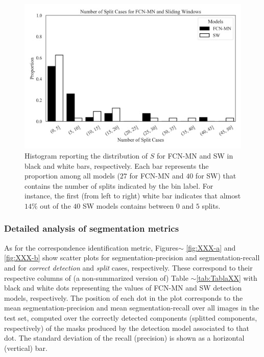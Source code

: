 \documentclass[a4paper,authoryear,review]{elsarticle}
\begin{document}
\begin{figure}
    \centering
    \includegraphics[width=\textwidth]{figures/PPP_split_distribution.png}
    \caption{
Histogram reporting the distribution of $S$ for FCN-MN and SW in black and white bars, respectively. Each bar represents the proportion among all models ($27$ for FCN-MN  and $40$ for SW) that contains the number of splits indicated by the bin label. For instance, the first (from left to right) white bar indicates that almost $14\%$ out of the $40$ SW models contains between $0$ and $5$ splits.
    }
    \label{fig:number-of-split}
\end{figure}


\subsubsection{Detailed analysis of segmentation metrics}

As for the correspondence identification metric, Figures$\sim$ \ref{fig:XXX-a} and \ref{fig:XXX-b} show scatter plots for segmentation-precision and segmentation-recall and for \emph{correct detection} and \emph{split} cases, respectively. These correspond to their respective columns of (a non-summarized version of) Table $\sim$\ref{tab:TablaXX} with black and white dots representing the values of FCN-MN and SW detection models, respectively. The position of each dot in the plot corresponds to the mean segmentation-precision and mean segmentation-recall over all images in the test set, computed over the correctly detected components (splitted components, respectively) of the masks produced by the detection model associated to that dot. The standard deviation of the recall (precision) is shown as a horizontal (vertical) bar.
\end{document}
